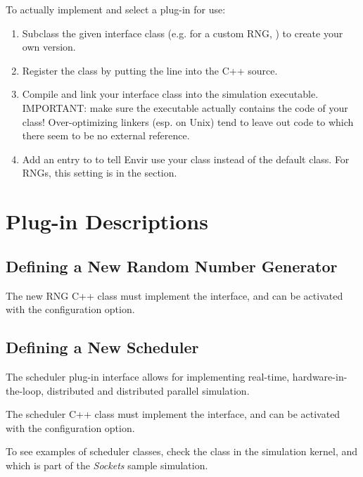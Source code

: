 To actually implement and select a plug-in for use:

\begin{enumerate}
   \item Subclass the given interface class (e.g. for a custom RNG, )
     to create your own version.
   \item Register the class by putting the 
     line into the C++ source.
   \item Compile and link your interface class into the {\opp} simulation
     executable. IMPORTANT: make sure the executable actually contains
     the code of your class! Over-optimizing linkers (esp. on Unix)
     tend to leave out code to which there seem to be no external reference.
   \item Add an entry to  to tell Envir use your class
     instead of the default class. For RNGs, this setting is 
     in the \ttt{[General]} section.
\end{enumerate}


\section{Plug-in Descriptions}


\subsection{Defining a New Random Number Generator}
\label{sec:plugin-exts:rng}

The new RNG C++ class must implement the  interface,
and can be activated with the  configuration option.


\subsection{Defining a New Scheduler}
\label{sec:plugin-exts:scheduler}

The scheduler plug-in interface allows for implementing real-time,
hardware-in-the-loop, distributed and distributed parallel simulation.

The scheduler C++ class must implement the  interface,
and can be activated with the  configuration option.

To see examples of scheduler classes, check the 
class in the simulation kernel, and  which is part
of the \textit{Sockets} sample simulation.


